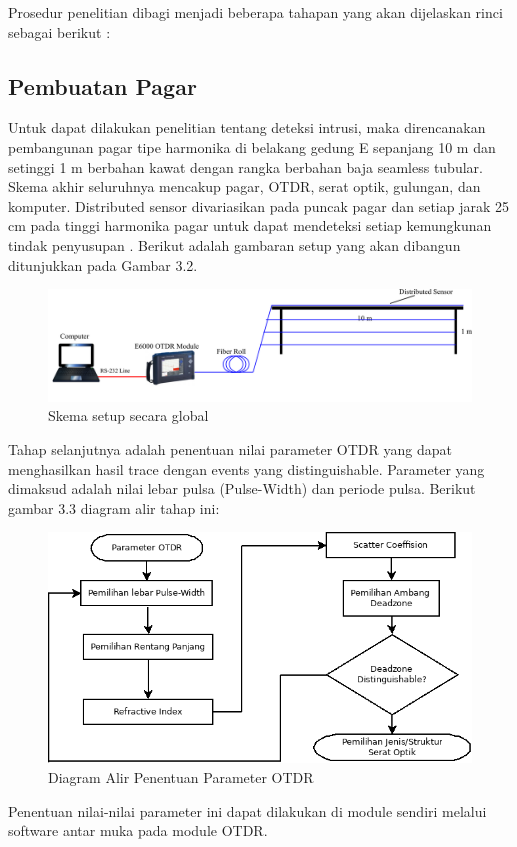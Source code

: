 \documentclass[12pt]{article}
\begin{document}
	Prosedur penelitian dibagi menjadi beberapa tahapan yang akan dijelaskan rinci sebagai berikut :
	
	\subsection{Pembuatan Pagar}
	
	Untuk dapat dilakukan penelitian tentang deteksi intrusi, maka direncanakan pembangunan pagar tipe harmonika di belakang gedung E sepanjang 10 m dan setinggi 1 m berbahan kawat dengan rangka berbahan baja seamless tubular.
	Skema akhir seluruhnya mencakup pagar, OTDR, serat optik, gulungan, dan komputer.
	Distributed sensor divariasikan pada puncak pagar dan setiap jarak 25 cm pada tinggi harmonika pagar untuk dapat mendeteksi setiap kemungkunan tindak penyusupan \cite{Huang2017}.
	Berikut adalah gambaran setup yang akan dibangun ditunjukkan pada Gambar 3.2.
	
	\begin{figure}[h!]
		\centering
		\captionsetup{justification=centering}
		\includegraphics[width=0.5\linewidth]{images/Bab_3/Bab_3_2}
		\caption[Skema Setup]{\small{Skema setup secara global}}
	\end{figure}

	Tahap selanjutnya adalah penentuan nilai parameter OTDR yang dapat menghasilkan hasil trace dengan events yang distinguishable. Parameter yang dimaksud adalah nilai lebar pulsa (Pulse-Width) dan periode pulsa.
	Berikut gambar 3.3 diagram alir tahap ini:
	
	\begin{figure}[h!]
		\centering
		\captionsetup{justification=centering}
		\includegraphics[width=0.5\linewidth]{images/Bab_3/Bab_3_3}
		\caption[Parameter OTDR ]{\small{Diagram Alir Penentuan Parameter OTDR }}
	\end{figure}

	Penentuan nilai-nilai parameter ini dapat dilakukan di module sendiri melalui software antar muka pada module OTDR.
	
\end{document}
